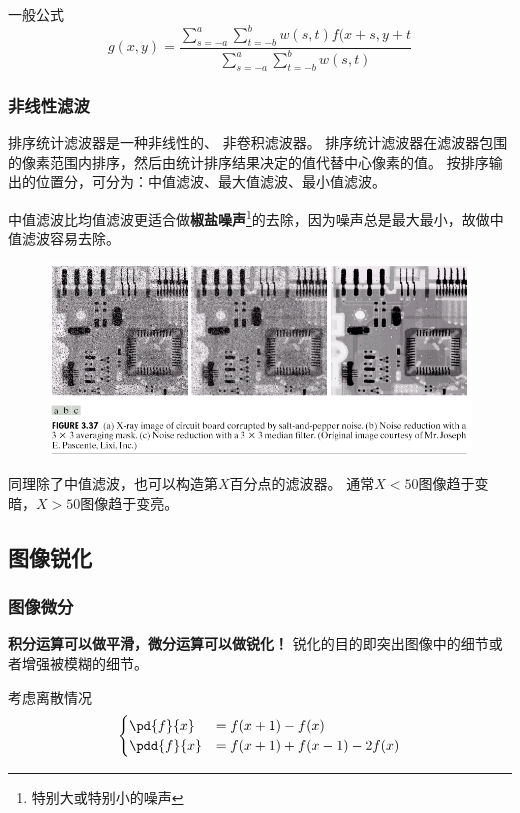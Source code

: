 一般公式
\[g(x,y)=\frac{\sum_{s=-a}^a\sum_{t=-b}^b w(s,t)f(x+s,y+t}{\sum_{s=-a}^a\sum_{t=-b}^b w(s,t)}\]

\subsubsection{非线性滤波}
排序统计滤波器是一种非线性的、 非卷积滤波器。
排序统计滤波器在滤波器包围的像素范围内排序，然后由统计排序结果决定的值代替中心像素的值。
按排序输出的位置分，可分为：中值滤波、最大值滤波、最小值滤波。

中值滤波比均值滤波更适合做\textbf{椒盐噪声}\footnote{特别大或特别小的噪声}的去除，因为噪声总是最大最小，故做中值滤波容易去除。
\begin{figure}[H]
\centering
\includegraphics[width=0.8\linewidth]{fig/salt-and-pepper-noise.png}
\end{figure}

同理除了中值滤波，也可以构造第$X$百分点的滤波器。
通常$X<50$图像趋于变暗，$X>50$图像趋于变亮。


\subsection{图像锐化}
\subsubsection{图像微分}
\textbf{积分运算可以做平滑，微分运算可以做锐化！}
锐化的目的即突出图像中的细节或者增强被模糊的细节。

考虑离散情况
\[\begin{cases}
\pd{f}{x}&=f(x+1)-f(x)\\
\pdd{f}{x}&=f(x+1)+f(x-1)-2f(x)
\end{cases}\]

